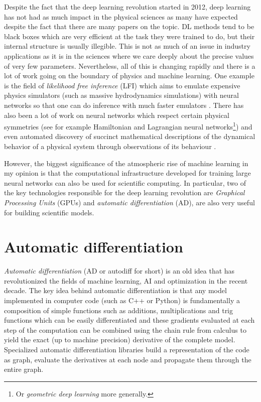 \documentclass[12pt,dvipsnames]{report}
\newcommand{\ssf}[1]{\textsf{#1}}
\begin{document}
Despite the fact that the deep learning revolution started in 2012, 
deep learning has not had as much impact  in the physical sciences as many have 
expected  despite the fact that  there are many papers on the topic.
DL methods tend to be black boxes which are very efficient at 
the task they were trained to do, but their internal structure is usually 
illegible. This is not as much of an issue in industry applications as it is 
in the sciences where we care deeply about the precise values of very few 
parameters.
Nevertheless, all of this is changing rapidly and there is  a lot of work 
going on the boundary of physics and machine learning. One example is the field 
of \textsl{likelihood free inference} (LFI) which aims to emulate expensive 
physics simulators (such as massive hydrodynamics simulations) with neural 
networks so that one can do inference with much faster emulators 
\citep[see for example the review paper by]{2020PNAS..11730055C}. There has 
also been a lot of work on neural networks which respect certain physical 
symmetries (see for example Hamiltonian and Lagrangian neural 
networks\footnote{Or \textsl{geometric deep learning} more generally.})
and even automated discovery of succinct mathematical descriptions of 
the dynamical behavior of a physical system through observations of its 
behaviour \citep{arXiv:2006.11287}.

However, the biggest significance of the atmospheric rise of machine learning 
in my opinion is that the computational infrastructure developed for training 
large neural networks can also be used for scientific computing. In particular,
two of the key technologies responsible for the deep learning  revolution
are \textsl{Graphical Processing Units} (GPUs) and 
\textsl{automatic differentiation} (AD), are also very useful 
for building scientific models. 

\section{Automatic differentiation}
\label{sec:autodiff}
\textsl{Automatic differentiation} (AD or autodiff for short)\citep{10.1145/355586.364791} is an old idea 
that has revolutionized the fields of machine learning, AI and optimization in the 
recent decade. 
The key idea behind automatic differentiation 
is that any model implemented in computer code (such as \ssf{C++} or 
\ssf{Python}) is fundamentally a composition 
of simple functions such as additions, multiplications and trig functions 
which can be easily differentiated and these gradients evaluated at each step 
of the computation can be combined using the chain rule from calculus to 
yield the exact (up to machine precision) derivative of the complete model.
Specialized automatic differentiation libraries build a representation of the 
code as graph, evaluate the derivatives at each node and propagate them through 
the entire graph. 
\end{document}
